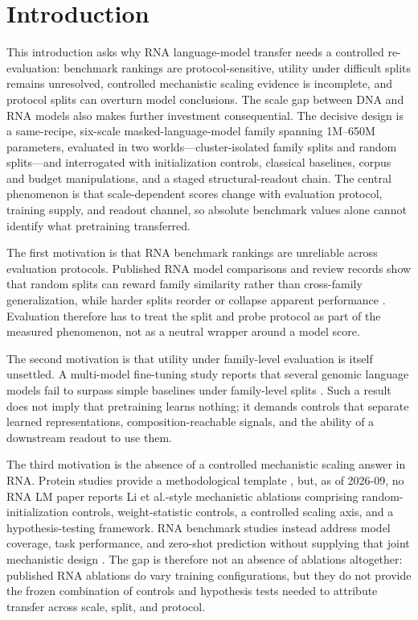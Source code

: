 \hypertarget{introduction}{%
\section{Introduction}\label{introduction}}

This introduction asks why RNA language-model transfer needs a controlled re-evaluation: benchmark rankings are protocol-sensitive, utility under difficult splits remains unresolved, controlled mechanistic scaling evidence is incomplete, and protocol splits can overturn model conclusions. The scale gap between DNA and RNA models also makes further investment consequential. The decisive design is a same-recipe, six-scale masked-language-model family spanning 1M--650M parameters, evaluated in two worlds---cluster-isolated family splits and random splits---and interrogated with initialization controls, classical baselines, corpus and budget manipulations, and a staged structural-readout chain. The central phenomenon is that scale-dependent scores change with evaluation protocol, training supply, and readout channel, so absolute benchmark values alone cannot identify what pretraining transferred.

The first motivation is that RNA benchmark rankings are unreliable across evaluation protocols. Published RNA model comparisons and review records show that random splits can reward family similarity rather than cross-family generalization, while harder splits reorder or collapse apparent performance \citep{nabench,rnascope}. Evaluation therefore has to treat the split and probe protocol as part of the measured phenomenon, not as a neutral wrapper around a model score.

The second motivation is that utility under family-level evaluation is itself unsettled. A multi-model fine-tuning study reports that several genomic language models fail to surpass simple baselines under family-level splits \citep{genomic_finetuning}. Such a result does not imply that pretraining learns nothing; it demands controls that separate learned representations, composition-reachable signals, and the ability of a downstream readout to use them.

The third motivation is the absence of a controlled mechanistic scaling answer in RNA. Protein studies provide a methodological template \citep{li_feature}, but, as of 2026-09, no RNA LM paper reports Li et al.-style mechanistic ablations comprising random-initialization controls, weight-statistic controls, a controlled scaling axis, and a hypothesis-testing framework. RNA benchmark studies instead address model coverage, task performance, and zero-shot prediction without supplying that joint mechanistic design \citep{beacon,zero_shot_rna,rnagym}. The gap is therefore not an absence of ablations altogether: published RNA ablations do vary training configurations, but they do not provide the frozen combination of controls and hypothesis tests needed to attribute transfer across scale, split, and protocol.

